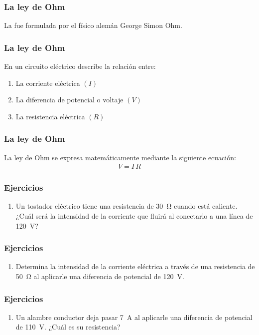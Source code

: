 \documentclass[14pt]{beamer}
\begin{document}
\begin{frame}
\frametitle{La ley de Ohm}
La  fue formulada por el físico alemán George Simon Ohm.
\end{frame}
\begin{frame}
\frametitle{La ley de Ohm}
En un circuito eléctrico describe la relación entre:
\pause
{}
\begin{enumerate}[<+->]
\item La corriente eléctrica $(I)$
\item La diferencia de potencial o voltaje $(V)$
\item La resistencia eléctrica $(R)$
\end{enumerate}
\end{frame}
\begin{frame}
\frametitle{La ley de Ohm}
La ley de Ohm se expresa matemáticamente mediante la siguiente ecuación:
\pause
\begin{align*}
V = I \, R
\end{align*}
\end{frame}
\begin{frame}
\frametitle{Ejercicios}
\begin{enumerate}[<+->]
\item Un tostador eléctrico tiene una resistencia de \SI{30}{\ohm} cuando está caliente. ¿Cuál será la intensidad de la corriente que fluirá al conectarlo a una línea de \SI{120}{\volt}?
\seti
\end{enumerate}
\end{frame}
\begin{frame}
\frametitle{Ejercicios}
\begin{enumerate}[<+->]
\conti
\item Determina la intensidad de la corriente eléctrica a través de una resistencia de \SI{50}{\ohm} al aplicarle una diferencia de potencial de \SI{120}{\volt}.
\seti
\end{enumerate}
\end{frame}
\begin{frame}
\frametitle{Ejercicios}
\begin{enumerate}[<+->]
\conti
\item Un alambre conductor deja pasar \SI{7}{\ampere} al aplicarle una diferencia de potencial de \SI{110}{\volt}. ¿Cuál es su resistencia?
\end{enumerate}
\end{frame}
\end{document}
